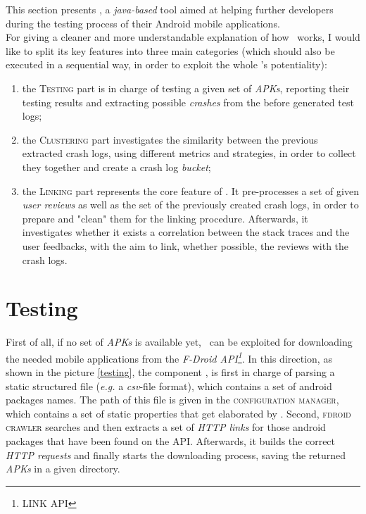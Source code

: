 \label{chapter:tool}
This section presents \toolname, a \textit{java-based} tool aimed at helping further developers during the testing process of their Android mobile applications. \\
For giving a cleaner and more understandable explanation of how \toolname\ works, I would like to split its key features into three main categories (which should also be executed in a sequential way, in order to exploit the whole \toolname's potentiality): 
\begin{enumerate}
\item the \textsc{Testing} part is in charge of testing a given set of \textit{APKs}, reporting their testing results and extracting possible \textit{crashes} from the before generated test logs; 

\item the \textsc{Clustering} part investigates the similarity between the previous extracted crash logs, using different metrics and strategies, in order to collect they together and create a crash log \textit{bucket}; 

\item the \textsc{Linking} part represents the core feature of \toolname. It pre-processes a set of given \textit{user reviews} as well as the set of the previously created crash logs, in order to prepare and "clean" them for the linking procedure.  Afterwards, it investigates whether it exists a correlation between the stack traces and the user feedbacks, with the aim to link, whether possible, the reviews with the crash logs. 
\end{enumerate}

\section{Testing}
First of all, if no set of \textit{APKs} is available yet, \toolname\ can be exploited for downloading the needed mobile applications from the \textit{F-Droid API\footnote{LINK API}}. In this direction, as shown in the picture \ref{testing}, the component \FDroidCrawler, is first in charge of  parsing a static structured file (\textit{e.g.} a \textit{csv}-file format), which contains a set of android packages names. 
The path of this file is given in the \textsc{configuration manager}, which contains a set of static properties that get elaborated by \toolname. Second, \textsc{fdroid crawler} searches and then extracts a set of \textit{HTTP links} for those android packages that have been found on the API. Afterwards, it builds the correct \textit{HTTP requests} and finally starts the downloading process, saving the returned \textit{APKs} in a given directory.

